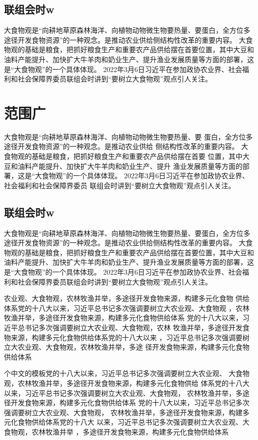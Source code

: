\subsection{联组会时w}
大食物观是“向耕地草原森林海洋、向植物动物微生物要热量、要蛋白，全方位多途径开发食物资源”的一种观念。是推动农业供给侧结构性改革的重要内容。
大食物观的基础是粮食，把抓好粮食生产和重要农产品供给摆在首要位置，其中大豆和油料产能提升、加快扩大牛羊肉和奶业生产、提升渔业发展质量等方面的部署，这是“大食物观”的一个具体体现。
2022年3月6日习近平在参加政协农业界、社会福利和社会保障界委员联组会时讲到“要树立大食物观”观点引人关注。
\section{范围广}
大食物观是“向耕地草原森林海洋、向植物动物微生物要热量、要
蛋白，全方位多途径开发食物资源”的一种观念。是推动农业供给
侧结构性改革的重要内容。
大食物观的基础是粮食，把抓好粮食生产和重要农产品供给摆在首要
位置，其中大豆和油料产能提升、加快扩大牛羊肉和奶业生产、提升
渔业发展质量等方面的部署，这是“大食物观”的一个具体体现。
2022年3月6日习近平在参加政协农业界、社会福利和社会保障界委员
联组会时讲到“要树立大食物观”观点引人关注。
\subsection{联组会时w}
大食物观是“向耕地草原森林海洋、向植物动物微生物要热量、要蛋白，全方位多途径开发食物资源”的一种观念。是推动农业供给侧结构性改革的重要内容。
大食物观的基础是粮食，把抓好粮食生产和重要农产品供给摆在首要位置，其中大豆和油料产能提升、加快扩大牛羊肉和奶业生产、提升渔业发展质量等方面的部署，这是“大食物观”的一个具体体现。
2022年3月6日习近平在参加政协农业界、社会福利和社会保障界委员联组会时讲到“要树立大食物观”观点引人关注。

农业观、大食物观，农林牧渔并举，多途径开发食物来源，构建多元化食物
供给体系党的十八大以来，习近平总书记多次强调要树立大农业观、大食物观
，农林牧渔并举，多途径开发食物来源，构建多元化食物供给体系
党的十八大以来，习近平总书记多次强调要树立大农业观、大食物观，农林
牧渔并举，多途径开发食物来源，构建多元化食物供给体系党的十八大以来
，习近平总书记多次强调要树立大农业观、大食物观，农林牧渔并举，多途
径开发食物来源，构建多元化食物供给体系	

个中文的模板党的十八大以来，习近平总书记多次强调要树立大农业观、
大食物观，农林牧渔并举，多途径开发食物来源，构建多元化食物供给
体系党的十八大以来，习近平总书记多次强调要树立大农业观、大食物观，
农林牧渔并举，多途径开发食物来源，构建多元化食物供给体系
党的十八大以来，习近平总书记多次强调要树立大农业观、大食物观，
农林牧渔并举，多途径开发食物来源，构建多元化食物供给体系党的十八大
以来，习近平总书记多次强调要树立大农业观、大食物观，农林牧渔并举
，多途径开发食物来源，构建多元化食物供给体系
